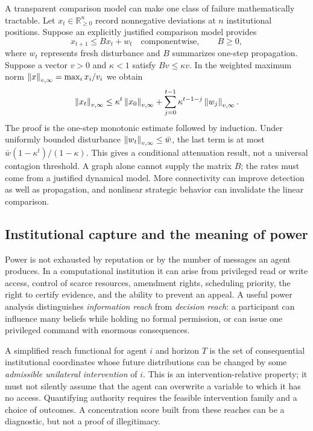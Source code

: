 A transparent comparison model can make one class of failure mathematically tractable. Let $x_t\in\mathbb R_{\ge0}^n$ record nonnegative deviations at $n$ institutional positions. Suppose an explicitly justified comparison model provides
\begin{equation}\label{MS:eq:propagation}
x_{t+1}\le Bx_t+w_t
\quad\text{componentwise},\qquad B\ge0,
\end{equation}
where $w_t$ represents fresh disturbance and $B$ summarizes one-step propagation. Suppose a vector $v>0$ and $\kappa<1$ satisfy $Bv\le\kappa v$. In the weighted maximum norm $\left\lVert x\right\rVert_{v,\infty}=\max_i x_i/v_i$ we obtain
\begin{equation}\label{MS:eq:propagation-bound}
\left\lVert x_t\right\rVert_{v,\infty}\le
\kappa^t\left\lVert x_0\right\rVert_{v,\infty}
+\sum_{j=0}^{t-1}\kappa^{t-1-j}\left\lVert w_j\right\rVert_{v,\infty}.
\end{equation}
The proof is the one-step monotonic estimate followed by induction. Under uniformly bounded disturbance $\left\lVert w_t\right\rVert_{v,\infty}\le\bar w$, the last term is at most $\bar w(1-\kappa^t)/(1-\kappa)$. This gives a conditional attenuation result, not a universal contagion threshold. A graph alone cannot supply the matrix $B$; the rates must come from a justified dynamical model. More connectivity can improve detection as well as propagation, and nonlinear strategic behavior can invalidate the linear comparison.

\subsection{Institutional capture and the meaning of power}

Power is not exhausted by reputation or by the number of messages an agent produces. In a computational institution it can arise from privileged read or write access, control of scarce resources, amendment rights, scheduling priority, the right to certify evidence, and the ability to prevent an appeal. A useful power analysis distinguishes \emph{information reach} from \emph{decision reach}: a participant can influence many beliefs while holding no formal permission, or can issue one privileged command with enormous consequences.

A simplified reach functional for agent $i$ and horizon $T$ is the set of consequential institutional coordinates whose future distributions can be changed by some \emph{admissible unilateral intervention} of $i$. This is an intervention-relative property; it must not silently assume that the agent can overwrite a variable to which it has no access. Quantifying authority requires the feasible intervention family and a choice of outcomes. A concentration score built from these reaches can be a diagnostic, but not a proof of illegitimacy.


